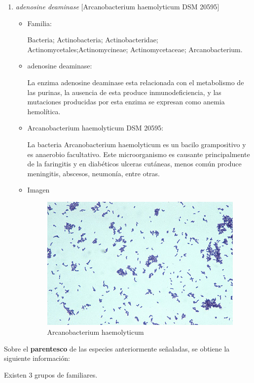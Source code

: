 \begin{enumerate}
	\item \emph{adenosine deaminase} $[$Arcanobacterium haemolyticum DSM 20595$]$~\cite{match6}
	\begin{itemize}
		\item Familia:
		
			Bacteria; Actinobacteria; Actinobacteridae; Actinomycetales;Actinomycineae; Actinomycetaceae; Arcanobacterium.
		\item adenosine deaminase:

			La enzima adenosine deaminase esta relacionada con el metabolismo de las purinas, la ausencia
			de esta produce inmunodeficiencia, y las mutaciones producidas por esta enzima se expresan
			como anemia hemolítica.
		\item Arcanobacterium haemolyticum DSM 20595:

			La bacteria Arcanobacterium haemolyticum es un bacilo grampositivo y es anaerobio facultativo.
			Este microorganismo es causante principalmente de la faringitis y en diabéticos ulceras cutáneas,
			menos común produce meningitis, abscesos, neumonía, entre otras.
		\item Imagen
			\begin{figure}[!h]
			\begin{center}
				\includegraphics[width=0.32\linewidth, height=!]{img/6}
				\caption{Arcanobacterium haemolyticum}
			    \label{fig:match6}
			\end{center}
			\end{figure}
	\end{itemize}
\end{enumerate}

Sobre el \textbf{parentesco} de las especies anteriormente señaladas, se obtiene la siguiente información:

Existen 3 grupos de familiares.

